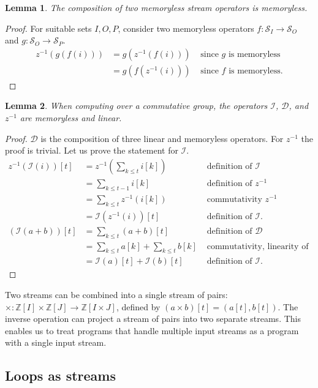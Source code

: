 \documentclass[10pt]{article}
\newtheorem{lemma}{Lemma}[section]
\newcommand{\Z}{\mathbb{Z}}  %
\newcommand{\stream}[1]{\ensuremath{\mathcal{S}_{#1}}}
\newcommand{\zm}{\ensuremath{z^{-1}}} %
\newcommand{\I}{\mathcal{I}}  %
\newcommand{\D}{\mathcal{D}}  %
\begin{document}
\begin{lemma}
  The composition of two memoryless stream operators is memoryless.
\end{lemma}
\begin{proof}
  For suitable sets $I, O, P$, consider two memoryless operators $f:
  \stream{I} \rightarrow \stream{O}$ and $g: \stream{O} \rightarrow
  \stream{P}$.
$$
\begin{aligned}
  \zm(g(f(i))) &= g(\zm(f(i))) & \mbox{ since $g$ is memoryless} \\
  &= g(f(\zm(i))) & \mbox{ since $f$ is memoryless}.
\end{aligned}
$$
\end{proof}

\begin{lemma}
  When computing over a commutative group, the operators $\I$, $\D$,
  and $\zm$ are memoryless and linear.
\end{lemma}
\begin{proof}
  $\D$ is the composition of three linear and memoryless operators.
  For $\zm$ the proof is trivial.  Let us prove the statement for $\I$.
  $$
\begin{aligned}
  \zm(\I(i))[t] &= \zm(\sum_{k \leq t} i[k]) & \mbox{ definition of }\I \\
  &= \sum_{k \leq t-1} i[k] & \mbox{ definition of }\zm \\
  &= \sum_{k \leq t} \zm(i[k]) & \mbox{ commutativity }\zm \\
  &= \I(\zm(i))[t] & \mbox{ definition of }\I. \\
  (\I(a + b))[t] &= \sum_{k \leq t}(a + b)[t] & \mbox{ definition of }\D \\
  &= \sum_{k \leq t} a[k] + \sum_{k \leq t} b[k] & \mbox{ commutativity, linearity of + } \\
  &= \I(a)[t] + \I(b)[t] & \mbox{ definition of }\I.
\end{aligned}
$$
\end{proof}

Two streams can be combined into a single stream of pairs: $\times:
\Z[I] \times \Z[J] \rightarrow \Z[I \times J]$, defined by $(a \times
b)[t] = (a[t], b[t])$.  The inverse operation can project a stream of
pairs into two separate streams.  This enables us to treat programs
that handle multiple input streams as a program with a single input
stream.

\subsection{Loops as streams}
\end{document}
